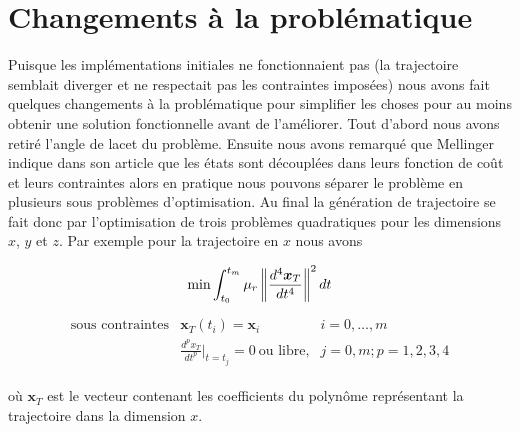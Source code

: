 \section{Changements à la problématique}

Puisque les implémentations initiales ne fonctionnaient pas (la trajectoire semblait diverger et ne respectait pas les contraintes imposées) nous avons fait quelques changements à la problématique pour simplifier les choses pour au moins obtenir une solution fonctionnelle avant de l'améliorer. Tout d'abord nous avons retiré l'angle de lacet du problème. Ensuite nous avons remarqué que Mellinger indique dans son article que les états sont découplées dans leurs fonction de coût et leurs contraintes alors en pratique nous pouvons séparer le problème en plusieurs sous problèmes d'optimisation. Au final la génération de trajectoire se fait donc par l'optimisation de trois problèmes quadratiques pour les dimensions $x$, $y$ et $z$. Par exemple pour la trajectoire en $x$ nous avons

\begin{align}\label{eq:opt_x}
\text{min} \int_{t_0}^{t_m} \mu_r \left\lVert\frac{d^4 \boldsymbol{x}_T}{dt^4}\right\rVert^2 dt
\end{align}\begin{align*}
	\begin{array}{lll}
		\text{sous contraintes} & \boldsymbol{x}_T(t_i) = \boldsymbol{x}_i & i = 0, \ldots, m\\
		& \frac{d^p x_T}{dt^p}|_{t=t_j} = 0\ \text{ou libre,} & j = 0, m; p = 1, 2, 3, 4
	\end{array}
\end{align*}

où $\boldsymbol{x}_T$ est le vecteur contenant les coefficients du polynôme représentant la trajectoire dans la dimension $x$.
